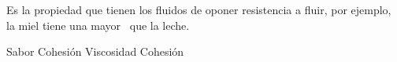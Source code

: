 
\question Es la propiedad que tienen los fluidos de oponer resistencia a
  fluir, por ejemplo, la miel tiene una mayor \fillin\ que la leche.

  \begin{oneparchoices}
    \choice Sabor
    \choice Cohesión
    \CorrectChoice Viscosidad
    \choice Cohesión
  \end{oneparchoices}
  \answerline[C]
